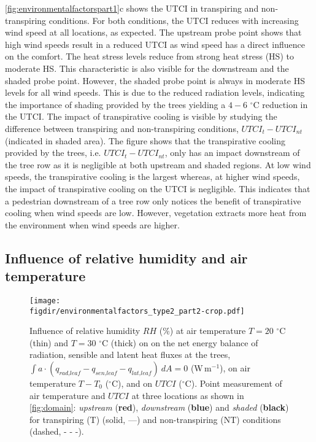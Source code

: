 \cref{fig:environmentalfactorspart1}c shows the UTCI in transpiring and non-transpiring conditions. For both conditions, the UTCI reduces with increasing wind speed at all locations, as expected. The upstream probe point shows that high wind speeds result in a reduced UTCI as wind speed has a direct influence on the comfort. The heat stress levels reduce from strong heat stress (HS) to moderate HS. This characteristic is also visible for the downstream and the shaded probe point. However, the shaded probe point is always in moderate HS levels for all wind speeds. This is due to the reduced radiation levels, indicating the importance of shading provided by the trees yielding a $4-6$ $^{\circ}$C reduction in the UTCI. The impact of transpirative cooling is visible by studying the difference between transpiring and non-transpiring conditions, $\textit{UTCI}_t-\textit{UTCI}_{\textit{nt}}$ (indicated in shaded area). The figure shows that the transpirative cooling provided by the trees, i.e. $\textit{UTCI}_t-\textit{UTCI}_{\textit{nt}}$, only has an impact downstream of the tree row as it is negligible at both upstream and shaded regions. At low wind speeds, the transpirative cooling is the largest whereas, at higher wind speeds, the impact of transpirative cooling on the UTCI is negligible. This indicates that a pedestrian downstream of a tree row only notices the benefit of transpirative cooling when wind speeds are low. However, vegetation extracts more heat from the environment when wind speeds are higher.

\subsection{Influence of relative humidity and air temperature}

				
	\begin{figure}[t]
		\centering
		\texttt{[image: \\figdir/environmentalfactors\_type2\_part2-crop.pdf]}
		\caption{Influence of relative humidity $RH$ (\%) at air temperature $T=20$ $^{\circ}$C (thin) and $T=30$ $^{\circ}$C (thick) on  on the net energy balance of radiation, sensible and latent heat fluxes at the trees, $\int a \cdot (q_{\textit{rad,leaf}}-q_{\textit{sen,leaf}}-q_{\textit{lat,leaf}})\ dA = 0$ (W\,m$^{-1}$),  on air temperature $T-T_0$ ($^{\circ}$C), and  on $\textit{UTCI}$ ($^{\circ}$C). Point measurement of air temperature and $UTCI$ at three locations as shown in \cref{fig:domain}: \textit{upstream} ({\color{flatuidarkred}\textbf{red}}), \textit{downstream} ({\color{flatuidarkblue}\textbf{blue}}) and \textit{shaded} (\textbf{black}) for transpiring (T) (solid, ---) and non-transpiring (NT) conditions (dashed, - - -).}
		\label{fig:environmentalfactorspart2}
	\end{figure}

